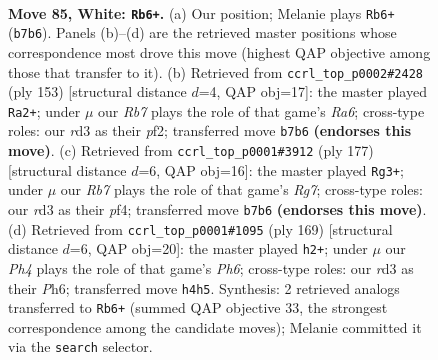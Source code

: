 \documentclass[11pt]{article}
\begin{document}
\clearpage

\begin{figure}[p]\centering
\begin{subfigure}{0.46\textwidth}\centering
\resizebox{\linewidth}{!}{%
\newchessgame
\chessboard[
  setfen={8/1R6/4k3/6K1/r6P/3r4/8/8 w - - 11 85},
  showmover=false,
  pgfstyle=straightmove, color=movearrow, markmove={b7-b6}
]}
\caption{}
\end{subfigure}\hfill
\begin{subfigure}{0.46\textwidth}\centering
\resizebox{\linewidth}{!}{%
\newchessgame
\chessboard[
  setfen={8/8/2p4R/3k4/8/r7/2K2P2/8 b - - 4 77},
  showmover=false,
  pgfstyle=straightmove, color=movearrow, markmove={a3-a2}
]}
\caption{}
\end{subfigure}
\\[4pt]
\begin{subfigure}{0.46\textwidth}\centering
\resizebox{\linewidth}{!}{%
\newchessgame
\chessboard[
  setfen={8/3k4/4p3/8/5P2/3K4/6r1/4R3 b - - 6 89},
  showmover=false,
  pgfstyle=straightmove, color=movearrow, markmove={g2-g3}
]}
\caption{}
\end{subfigure}\hfill
\begin{subfigure}{0.46\textwidth}\centering
\resizebox{\linewidth}{!}{%
\newchessgame
\chessboard[
  setfen={8/8/7p/8/6k1/R6p/2r5/6K1 b - - 11 85},
  showmover=false,
  pgfstyle=straightmove, color=movearrow, markmove={h3-h2}
]}
\caption{}
\end{subfigure}
\caption{\textbf{Move 85, White: \texttt{Rb6+}.} (a) Our position; Melanie plays \texttt{Rb6+} (\texttt{b7b6}). Panels (b)--(d) are the retrieved master positions whose correspondence most drove this move (highest QAP objective among those that transfer to it). (b) Retrieved from \texttt{ccrl\_top\_p0002\#2428} (ply 153) [structural distance $d$=4, QAP obj=17]: the master played \texttt{Ra2+}; under $\mu$ our \emph{Rb7} plays the role of that game's \emph{Ra6}; cross-type roles: our \emph{r}d3 as their \emph{p}f2; transferred move \texttt{b7b6} \textbf{(endorses this move)}. (c) Retrieved from \texttt{ccrl\_top\_p0001\#3912} (ply 177) [structural distance $d$=6, QAP obj=16]: the master played \texttt{Rg3+}; under $\mu$ our \emph{Rb7} plays the role of that game's \emph{Rg7}; cross-type roles: our \emph{r}d3 as their \emph{p}f4; transferred move \texttt{b7b6} \textbf{(endorses this move)}. (d) Retrieved from \texttt{ccrl\_top\_p0001\#1095} (ply 169) [structural distance $d$=6, QAP obj=20]: the master played \texttt{h2+}; under $\mu$ our \emph{Ph4} plays the role of that game's \emph{Ph6}; cross-type roles: our \emph{r}d3 as their \emph{P}h6; transferred move \texttt{h4h5}. Synthesis: 2 retrieved analogs transferred to \texttt{Rb6+} (summed QAP objective 33, the strongest correspondence among the candidate moves); Melanie committed it via the \texttt{search} selector.}
\label{fig:thought-m168}
\end{figure}
\end{document}
